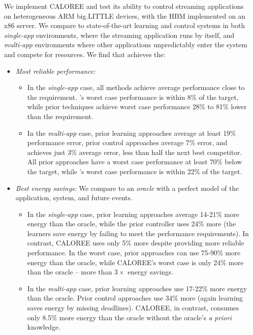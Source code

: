 We implement CALOREE and test its ability to control streaming
applications on heterogeneous ARM big.LITTLE devices, with the HBM
implemented on an x86 server.  We compare to state-of-the-art learning
and control systems in both \emph{single-app} environments, where the
streaming application runs by itself, and \emph{multi-app}
environments where other applications unpredictably enter the system
and compete for resources. We find that \SYSTEM{} achieves the:
\begin{itemize}
\item \textit{Most reliable performance:} 
  \begin{itemize} 
  \item In the \emph{single-app} case, all methods achieve average
    performance close to the requirement.  \SYSTEM{}'s worst case
    performance is within 8\% of the target, while prior techniques
    achieve worst case performance 28\% to 81\% lower than the
    requirement.
  \item In the \emph{multi-app} case, prior learning approaches
    average at least 19\% performance error, prior control approaches
    average 7\% error, and \SYSTEM{} achieves just 3\% average error,
    less than half the next best competitor.  All prior approaches
    have a worst case performance at least 70\% below the target,
    while \SYSTEM{}'s worst case performance is within 22\% of the
    target.
    \end{itemize}
  \item \textit{Best energy savings:} We compare to an \emph{oracle}
    with a perfect model of the application, system, and future
    events.
    \begin{itemize}
    \item In the \emph{single-app} case, prior learning approaches
      average 14-21\% more energy than the oracle, while the prior
      controller uses 24\% more (the learners save energy by failing
      to meet the performance requirements).  In contrast, CALOREE
      uses only 5\% more despite providing more reliable performance.
      In the worst case, prior approaches can use 75-90\% more energy
      than the oracle, while CALOREE's worst case is only 24\% more
      than the oracle -- more than $3\times$ energy savings.
    \item In the \emph{multi-app} case, prior learning approaches use
      17-22\% more energy than the oracle.  Prior control approaches
      use 34\% more (again learning saves energy by missing
      deadlines).  CALOREE, in contrast, consumes only 8.5\% more
      energy than the oracle without the oracle's {\em a priori}
      knowledge.
    \end{itemize}
\end{itemize}


